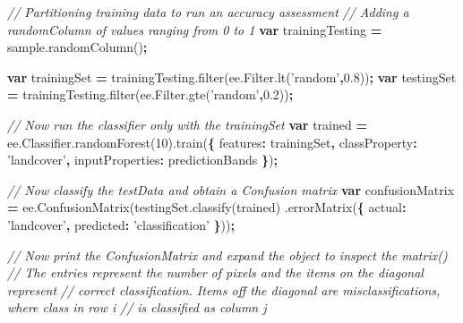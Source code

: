 \documentclass[]{article}
\newenvironment{Shaded}{\begin{snugshade}}{\end{snugshade}}
\newcommand{\AttributeTok}[1]{\textcolor[rgb]{0.77,0.63,0.00}{#1}}
\newcommand{\CommentTok}[1]{\textcolor[rgb]{0.56,0.35,0.01}{\textit{#1}}}
\newcommand{\DataTypeTok}[1]{\textcolor[rgb]{0.13,0.29,0.53}{#1}}
\newcommand{\DecValTok}[1]{\textcolor[rgb]{0.00,0.00,0.81}{#1}}
\newcommand{\FloatTok}[1]{\textcolor[rgb]{0.00,0.00,0.81}{#1}}
\newcommand{\KeywordTok}[1]{\textcolor[rgb]{0.13,0.29,0.53}{\textbf{#1}}}
\newcommand{\NormalTok}[1]{#1}
\newcommand{\OperatorTok}[1]{\textcolor[rgb]{0.81,0.36,0.00}{\textbf{#1}}}
\newcommand{\StringTok}[1]{\textcolor[rgb]{0.31,0.60,0.02}{#1}}
\newcommand{\VariableTok}[1]{\textcolor[rgb]{0.00,0.00,0.00}{#1}}
\begin{document}
\begin{Shaded}
\begin{Highlighting}[numbers=left,,]
\CommentTok{// Partitioning training data to run an accuracy assessment}
\CommentTok{// Adding a randomColumn of values ranging from 0 to 1}
\KeywordTok{var}\NormalTok{ trainingTesting }\OperatorTok{=} \VariableTok{sample}\NormalTok{.}\AttributeTok{randomColumn}\NormalTok{()}\OperatorTok{;}

\KeywordTok{var}\NormalTok{ trainingSet }\OperatorTok{=} \VariableTok{trainingTesting}\NormalTok{.}\AttributeTok{filter}\NormalTok{(}\VariableTok{ee}\NormalTok{.}\VariableTok{Filter}\NormalTok{.}\AttributeTok{lt}\NormalTok{(}\StringTok{'random'}\OperatorTok{,}\FloatTok{0.8}\NormalTok{))}\OperatorTok{;}
\KeywordTok{var}\NormalTok{ testingSet }\OperatorTok{=} \VariableTok{trainingTesting}\NormalTok{.}\AttributeTok{filter}\NormalTok{(}\VariableTok{ee}\NormalTok{.}\VariableTok{Filter}\NormalTok{.}\AttributeTok{gte}\NormalTok{(}\StringTok{'random'}\OperatorTok{,}\FloatTok{0.2}\NormalTok{))}\OperatorTok{;}

\CommentTok{// Now run the classifier only with the trainingSet}
\KeywordTok{var}\NormalTok{ trained }\OperatorTok{=} \VariableTok{ee}\NormalTok{.}\VariableTok{Classifier}\NormalTok{.}\AttributeTok{randomForest}\NormalTok{(}\DecValTok{10}\NormalTok{).}\AttributeTok{train}\NormalTok{(}\OperatorTok{\{}
  \DataTypeTok{features}\OperatorTok{:}\NormalTok{ trainingSet}\OperatorTok{,}
  \DataTypeTok{classProperty}\OperatorTok{:} \StringTok{'landcover'}\OperatorTok{,}
  \DataTypeTok{inputProperties}\OperatorTok{:}\NormalTok{ predictionBands}
\OperatorTok{\}}\NormalTok{)}\OperatorTok{;}

\CommentTok{// Now classify the testData and obtain a Confusion matrix}
\KeywordTok{var}\NormalTok{ confusionMatrix }\OperatorTok{=} \VariableTok{ee}\NormalTok{.}\AttributeTok{ConfusionMatrix}\NormalTok{(}\VariableTok{testingSet}\NormalTok{.}\AttributeTok{classify}\NormalTok{(trained)}
\NormalTok{                                                  .}\AttributeTok{errorMatrix}\NormalTok{(}\OperatorTok{\{}
                                                    \DataTypeTok{actual}\OperatorTok{:} \StringTok{'landcover'}\OperatorTok{,}
                                                    \DataTypeTok{predicted}\OperatorTok{:} \StringTok{'classification'}
                                                  \OperatorTok{\}}\NormalTok{))}\OperatorTok{;}

\CommentTok{// Now print the ConfusionMatrix and expand the object to inspect the matrix()}
\CommentTok{// The entries represent the number of pixels and the items on the diagonal represent}
\CommentTok{// correct classification. Items off the diagonal are misclassifications, where class in row i}
\CommentTok{// is classified as column j}


\end{Highlighting}
\end{Shaded}
\end{document}
